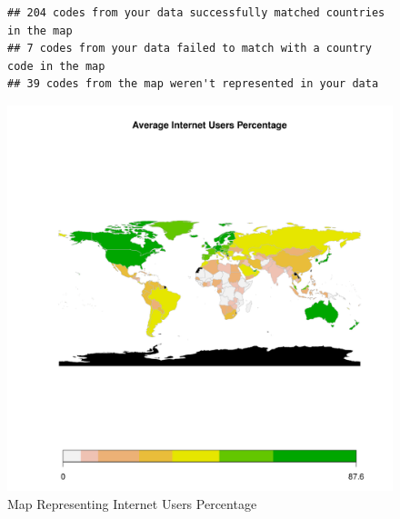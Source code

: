 \documentclass{article}\usepackage[]{graphicx}\usepackage[]{xcolor}
\makeatletter
\def\maxwidth{ %
  \ifdim\Gin@nat@width>\linewidth
    \linewidth
  \else
    \Gin@nat@width
  \fi
}
\newenvironment{kframe}{%
 \def\at@end@of@kframe{}%
 \ifinner\ifhmode%
  \def\at@end@of@kframe{\end{minipage}}%
  \begin{minipage}{\columnwidth}%
 \fi\fi%
 \def\FrameCommand##1{\hskip\@totalleftmargin \hskip-\fboxsep
 \colorbox{shadecolor}{##1}\hskip-\fboxsep
     \hskip-\linewidth \hskip-\@totalleftmargin \hskip\columnwidth}%
 \MakeFramed {\advance\hsize-\width
   \@totalleftmargin\z@ \linewidth\hsize
   \@setminipage}}%
 {\par\unskip\endMakeFramed%
 \at@end@of@kframe}
\newenvironment{knitrout}{}{} %
\makeatother
\begin{document}
\begin{figure}[h!]
\centering
\begin{knitrout}
\color{fgcolor}\begin{kframe}
\begin{verbatim}
## 204 codes from your data successfully matched countries in the map
## 7 codes from your data failed to match with a country code in the map
## 39 codes from the map weren't represented in your data
\end{verbatim}
\end{kframe}
\includegraphics[width=\maxwidth]{figure/unnamed-chunk-21-1} 
\end{knitrout}
\caption{Map Representing Internet Users Percentage}

\label{fig}
\end{figure}


\newpage
\end{document}
